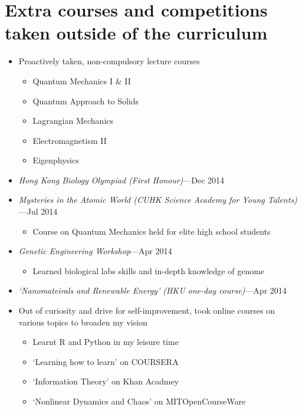 \documentclass[a4paper, 12pt]{article}
\newcommand{\expentry}[3]{\emph{#1}\hfill{#2}---{#3}}
\begin{document}
\section{Extra courses and competitions taken outside of the curriculum}
\begin{itemize}
    \item Proactively taken, non-compulsory lecture courses
    \begin{itemize}
        \setlength\itemsep{0em}
        \item Quantum Mechanics I \& II
        \item Quantum Approach to Solids
        \item Lagrangian Mechanics
        \item Electromagnetism II
        \item Eigenphysics
    \end{itemize}
    \item \expentry{Hong Kong Biology Olympiad (First Honour)}{}{Dec 2014}
    \item \expentry{Mysteries in the Atomic World (CUHK Science Academy for Young Talents)}{}{Jul 2014}
    \begin{itemize}
        \item Course on Quantum Mechanics held for elite high school students
    \end{itemize}
    \item \expentry{Genetic Engineering Workshop}{}{Apr 2014}
    \begin{itemize}
        \item Learned biological labs skills and in-depth knowledge of genome
    \end{itemize}
    \item \expentry{`Nanomateirals and Renewable Energy' (HKU one-day course)}{}{Apr 2014}
    \item Out of curiosity and drive for self-improvement, took online courses on various topics to broaden my vision
    \begin{itemize}
        \setlength\itemsep{0em}
        \item Learnt R and Python in my leisure time
        \item `Learning how to learn' on COURSERA
        \item `Information Theory' on Khan Acadmey
        \item `Nonlinear Dynamics and Chaos' on MITOpenCourseWare
    \end{itemize}
\end{itemize}


% 
% 
\end{document}
